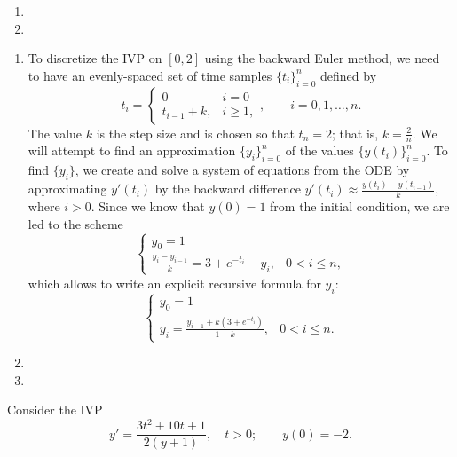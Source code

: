\documentclass{homework}
\begin{document}
\begin{arabicparts}
\begin{enumerate}[label=({\bf\alph*})]
			\item 
			\item
		\end{enumerate}
		
		\questionpart
		\begin{enumerate}[label=({\bf\alph*})]
			\item To discretize the IVP on $[0,2]$ using the backward Euler method, we need to have an evenly-spaced set of time samples $\{t_i\}_{i=0}^n$ defined by
			\begin{equation}
				t_i = \begin{cases}
					0 & i = 0 \\
					t_{i-1} + k, & i \ge 1,
				\end{cases}, \qquad i = 0,1,\dots,n.
			\end{equation}
			The value $k$ is the step size and is chosen so that $t_n = 2$; that is, $k = \frac{2}{n}$. We will attempt to find an approximation $\{y_i\}_{i=0}^n$ of the values $\{y(t_i)\}_{i=0}^n$. To find $\{y_i\}$, we create and solve a system of equations from the ODE by approximating $y'(t_i)$ by the backward difference $y'(t_i) \approx \frac{y(t_i) - y(t_{i-1})}{k}$, where $i > 0$. Since we know that $y(0) = 1$ from the initial condition, we are led to the scheme
			\begin{equation}
				\begin{cases}
					y_0 = 1 &\\
					\frac{y_i - y_{i-1}}{k} = 3 + e^{-t_i} - y_i, & 0 < i \le n,
				\end{cases}
			\end{equation}
			which allows to write an explicit recursive formula for $y_i$:
			\begin{equation}
				\begin{cases}
					y_0 = 1 &\\
					y_i = \frac{y_{i-1} + k(3 + e^{-t_i})}{1+k}, & 0 < i \le n.
				\end{cases}
			\end{equation}
			
			\item 
			\item
		\end{enumerate}
		
		\questionpart 
	\end{arabicparts}
	
	\question
	
	Consider the IVP
	\begin{equation}
		y' = \frac{3t^2+10t+1}{2(y+1)}, \quad t > 0; \qquad y(0) = -2.
	\end{equation}
	
\end{document}
